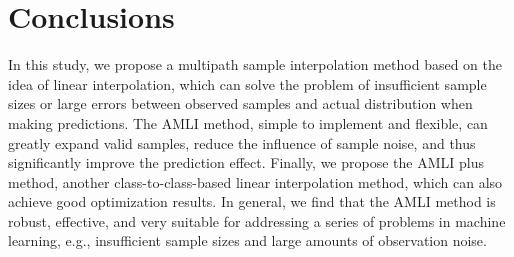 \documentclass[mathematics,article,accept,pdftex,moreauthors]{Definitions/mdpi}
\begin{document}
\section{ Conclusions}

In this study, we propose a multipath sample interpolation method based on the idea of linear interpolation, which can solve the problem of insufficient sample sizes or large errors between observed samples and actual distribution when making predictions. The AMLI method, simple to implement and flexible, can greatly expand valid samples, reduce the influence of sample noise, and thus significantly improve the prediction effect. Finally, we propose the AMLI plus method, another class-to-class-based linear interpolation method, which can also achieve good optimization results. In general, we find that the AMLI method is robust, effective, and very suitable for addressing a series of problems in machine learning, e.g., insufficient sample sizes and large amounts of observation noise.

\vspace{6pt}












%
%
%
%
%
%
%
%
%
%
\end{document}
